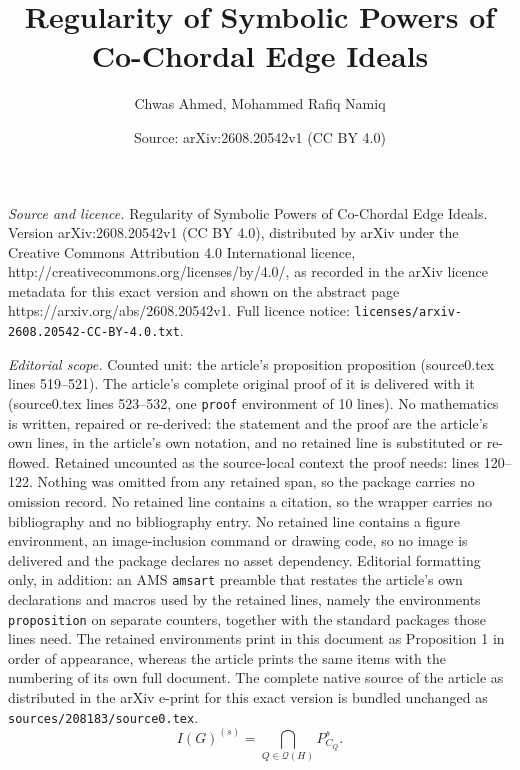 \documentclass[10pt,a4paper]{amsart}
\title{Regularity of Symbolic Powers of Co-Chordal Edge Ideals}
\author{Chwas Ahmed, Mohammed Rafiq Namiq}
\date{Source: arXiv:2608.20542v1 (CC BY 4.0)}
\newtheorem{proposition}{Proposition}
\newcommand{\cQ}{\mathcal Q}
\begin{document}
\maketitle

\noindent\emph{Source and licence.} Regularity of Symbolic Powers of Co-Chordal Edge Ideals. Version arXiv:2608.20542v1 (CC BY 4.0), distributed by arXiv under the Creative Commons Attribution 4.0 International licence, http://creativecommons.org/licenses/by/4.0/, as recorded in the arXiv licence metadata for this exact version and shown on the abstract page https://arxiv.org/abs/2608.20542v1. Full licence notice: \texttt{licenses/arxiv-2608.20542-CC-BY-4.0.txt}.\par\smallskip

\noindent\textit{Editorial scope.} Counted unit: the article's proposition proposition (source0.tex lines 519--521). The article's complete original proof of it is delivered with it (source0.tex lines 523--532, one \texttt{proof} environment of 10 lines). No mathematics is written, repaired or re-derived: the statement and the proof are the article's own lines, in the article's own notation, and no retained line is substituted or re-flowed.  Retained uncounted as the source-local context the proof needs: lines 120--122.  Nothing was omitted from any retained span, so the package carries no omission record.  No retained line contains a citation, so the wrapper carries no bibliography and no bibliography entry.  No retained line contains a figure environment, an image-inclusion command or drawing code, so no image is delivered and the package declares no asset dependency.  Editorial formatting only, in addition: an AMS \texttt{amsart} preamble that restates the article's own declarations and macros used by the retained lines, namely the environments \texttt{proposition} on separate counters, together with the standard packages those lines need.  The retained environments print in this document as Proposition 1 in order of appearance, whereas the article prints the same items with the numbering of its own full document.  The complete native source of the article as distributed in the arXiv e-print for this exact version is bundled unchanged as \texttt{sources/208183/source0.tex}.
\begin{equation}\label{eq:1}
I(G)^{(s)}=\bigcap_{Q\in\cQ(H)}P_{C_Q}^s.
\end{equation}

\end{document}
